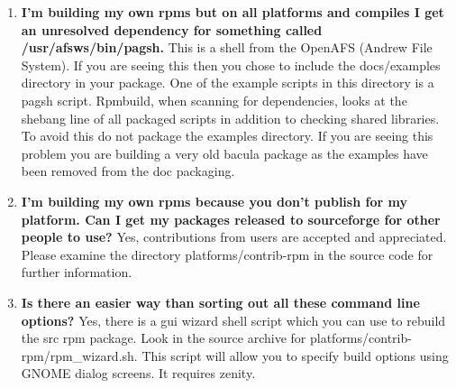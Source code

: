 \begin{enumerate}
If you are working on a shared system where you can not use the method
above then you need to recreate the appropriate above directory tree with all
of its subdirectories inside your home directory.  Then create a file named

{\tt .rpmmacros} 

in your home directory (or edit  the file if it already exists)
and add the following line:  

\footnotesize
\begin{verbatim}
        %_topdir /home/myuser/redhat
        %_tmppath /tmp
        
\end{verbatim}
\normalsize

Another handy directive for the .rpmmacros file if you wish to suppress the
creation of debug rpm packages is:

\footnotesize
\begin{verbatim}
        %debug_package %{nil}
        
\end{verbatim}

\normalsize

\item 
   \label{faq5}
   {\bf I'm building my own rpms but on all platforms and compiles I get an
   unresolved dependency for something called /usr/afsws/bin/pagsh.} This
   is a shell from the OpenAFS (Andrew File System).  If you are seeing
   this then you chose to include the docs/examples directory in your
   package.  One of the example scripts in this directory is a pagsh
   script.  Rpmbuild, when scanning for dependencies, looks at the shebang
   line of all packaged scripts in addition to checking shared libraries.
   To avoid this do not package the examples directory. If you are seeing this 
   problem you are building a very old bacula package as the examples have been 
   removed from the doc packaging.

\item 
   \label{faq6}
   {\bf I'm building my own rpms because you don't publish for my platform.
    Can I get my packages released to sourceforge for other people to use?} Yes, 
    contributions from users are accepted and appreciated. Please examine the 
    directory platforms/contrib-rpm in the source code for further information.

\item 
   \label{faq7}
   {\bf Is there an easier way than sorting out all these command line options?} Yes, 
    there is a gui wizard shell script which you can use to rebuild the src rpm package. 
   Look in the source archive for platforms/contrib-rpm/rpm\_wizard.sh. This script will 
   allow you to specify build options using GNOME dialog screens. It requires zenity.


\end{enumerate}
